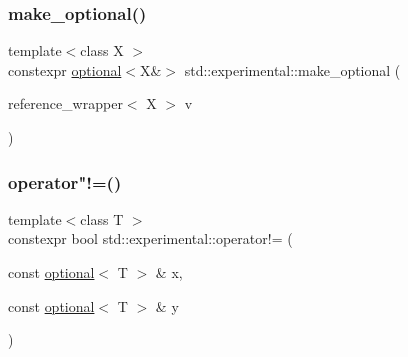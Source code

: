 \mbox{\label{namespacestd_1_1experimental_a0f7b286ddf3bb6c4e95580898dcde37b}} 
\subsubsection{\texorpdfstring{make\+\_\+optional()}{make\_optional()}\hspace{0.1cm}{\footnotesize\ttfamily [2/2]}}
{\footnotesize\ttfamily template$<$class X $>$ \\
constexpr \mbox{\hyperlink{classstd_1_1experimental_1_1optional}{optional}}$<$X\&$>$ std\+::experimental\+::make\+\_\+optional (\begin{DoxyParamCaption}\item[{reference\+\_\+wrapper$<$ X $>$}]{v }\end{DoxyParamCaption})}

\mbox{\label{namespacestd_1_1experimental_abf45cbc40acb4929dbf1caa3b31460d9}} 
\subsubsection{\texorpdfstring{operator"!=()}{operator!=()}\hspace{0.1cm}{\footnotesize\ttfamily [1/9]}}
{\footnotesize\ttfamily template$<$class T $>$ \\
constexpr bool std\+::experimental\+::operator!= (\begin{DoxyParamCaption}\item[{const \mbox{\hyperlink{classstd_1_1experimental_1_1optional}{optional}}$<$ T $>$ \&}]{x,  }\item[{const \mbox{\hyperlink{classstd_1_1experimental_1_1optional}{optional}}$<$ T $>$ \&}]{y }\end{DoxyParamCaption})}

\mbox{\label{namespacestd_1_1experimental_a768f39fe88fcf07a351e8f45d6dfb1b3}} 
